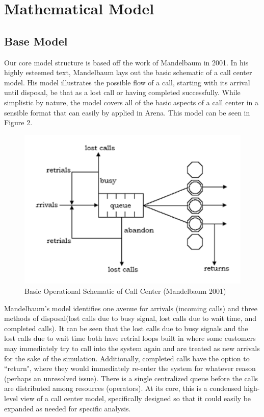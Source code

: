 \documentclass[12pt,twocolumn]{article}
\begin{document}
\section{Mathematical Model}

	\subsection{Base Model}
Our core model structure is based off the work of Mandelbaum in 2001\cite{mandelbaum}.  In his highly esteemed text, Mandelbaum lays out the basic schematic of a call center model.  His model illustrates the possible flow of a call, starting with its arrival until disposal, be that as a lost call or having completed successfully.  While simplistic by nature, the model covers all of the basic aspects of a call center in a sensible format that can easily by applied in Arena.  This model can be seen in Figure 2.  

	\begin{figure}[h]
	\includegraphics[scale=.45]{call_center_layout.png}
	\caption{Basic Operational Schematic of Call Center (Mandelbaum 2001)}
	\end{figure}

Mandelbaum's model identifies one avenue for arrivals (incoming calls) and three methods of disposal(lost calls due to busy signal, lost calls due to wait time, and completed calls).  It can be seen that the lost calls due to busy signals and the lost calls due to wait time both have retrial loops built in where some customers may immediately try to call into the system again and are treated as new arrivals for the sake of the simulation.  Additionally, completed calls have the option to ``return", where they would immediately re-enter the system for whatever reason (perhaps an unresolved issue).  There is a single centralized queue before the calls are distributed among resources (operators).  At its core, this is a condensed high-level view of a call center model, specifically designed so that it could easily be expanded as needed for specific analysis.
\end{document}
